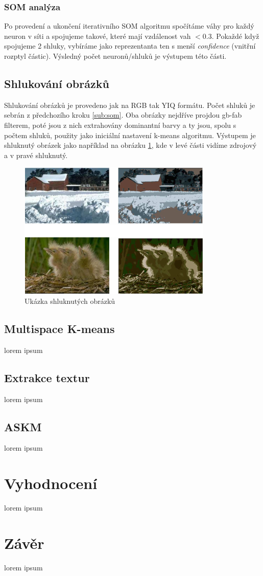 \documentclass[fleqn,numbers=noenddot,headinclude,%
				11pt,a4paper,footinclude,%
				cleardoublepage=empty,abstractoff %
                ]{scrartcl}
\begin{document}
\subsubsection{SOM analýza}
Po provedení a ukončení iterativního SOM algoritmu spočítáme váhy pro každý neuron v síti a spojujeme takové, které mají vzdálenost vah $<0.3$. Pokaždé když spojujeme 2 shluky, vybíráme jako reprezentanta ten s menší \textit{confidence} (vnitřní rozptyl částic). Výsledný počet neuronů/shluků je výstupem této části.

\subsection{Shlukování obrázků}
\label{sub:kmeans}
Shlukování obrázků je provedeno jak na RGB tak YIQ formátu. Počet shluků je sebrán z předchozího kroku \ref{sub:som}. Oba obrázky nejdříve projdou gb-fab filterem, poté jsou z nich extrahovány dominantní barvy a ty jsou, spolu s počtem shluků, použity jako iniciální nastavení k-means algoritmu. Výstupem je shluknutý obrázek jako například na obrázku \ref{img:clustered}, kde v levé části vidíme zdrojový a v pravé shluknutý.
\begin{figure}[htp]
\centering
\includegraphics[scale=1.00]{imgs/clustered.png}
\caption{Ukázka shluknutých obrázků}
\label{img:clustered}
\end{figure}

\subsection{Multispace K-means}
\label{sub:multi-kmeans}
lorem ipsum

\subsection{Extrakce textur}
\label{sub:textury}
lorem ipsum

\subsection{ASKM}
\label{sub:askm}
lorem ipsum


\section{Vyhodnocení}
\label{sec:vyhodnoceni}
lorem ipsum

\section{Závěr}
\label{sec:zaver}
lorem ipsum
%
\end{document}
